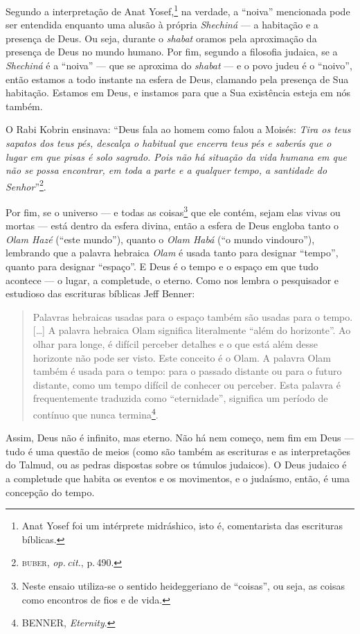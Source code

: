 Segundo a interpretação de Anat Yosef,\footnote{Anat Yosef foi um
  intérprete midráshico, isto é, comentarista das escrituras bíblicas.}
na verdade, a ``noiva'' mencionada pode ser entendida enquanto uma
alusão à própria \emph{Shechiná} --- a habitação e a presença de Deus.
Ou seja, durante o \emph{shabat} oramos pela aproximação da presença de
Deus no mundo humano. Por fim, segundo a filosofia judaica, se a
\emph{Shechiná} é a ``noiva'' --- que se aproxima do \emph{shabat} --- e
o povo judeu é o ``noivo'', então estamos a todo instante na esfera de
Deus, clamando pela presença de Sua habitação. Estamos em Deus, e
instamos para que a Sua existência esteja em nós também.

O Rabi Kobrin ensinava: ``Deus fala ao homem como falou a Moisés:
\emph{Tira os teus sapatos dos teus pés, descalça o habitual que encerra teus
pés e saberás que o lugar em que pisas é solo sagrado. Pois não há
situação da vida humana em que não se possa encontrar, em toda a parte e
a qualquer tempo, a santidade do Senhor}''\footnote{\textsc{buber}, \emph{op.\,cit.},
  p.\,490.}.

Por fim, se o universo --- e todas as coisas\footnote{Neste ensaio
  utiliza-se o sentido heideggeriano de ``coisas'', ou seja, as coisas
  como encontros de fios e de vida.} que ele contém, sejam elas vivas ou
mortas --- está dentro da esfera divina, então a esfera de Deus engloba
tanto o \emph{Olam Hazé} (``este mundo''), quanto o \emph{Olam Habá}
(``o mundo vindouro''), lembrando que a palavra hebraica \emph{Olam} é
usada tanto para designar ``tempo'', quanto para designar ``espaço''. E
Deus é o tempo e o espaço em que tudo acontece --- o lugar, a
completude, o eterno. Como nos lembra o pesquisador e estudioso das
escrituras bíblicas Jeff Benner:

\begin{quote}
Palavras hebraicas usadas para o espaço também são usadas para o tempo.
{[}\ldots{}{]} A palavra hebraica Olam significa literalmente ``além do
horizonte''. Ao olhar para longe, é difícil perceber detalhes e o que
está além desse horizonte não pode ser visto. Este conceito é o Olam. A
palavra Olam também é usada para o tempo: para o passado distante ou
para o futuro distante, como um tempo difícil de conhecer ou perceber.
Esta palavra é frequentemente traduzida como ``eternidade'', significa
um período de contínuo que nunca termina\footnote{BENNER,
  \emph{Eternity}.}.
\end{quote}

Assim, Deus não é infinito, mas eterno. Não há nem começo, nem fim em
Deus --- tudo é uma questão de meios (como são também as escrituras e as
interpretações do Talmud, ou as pedras dispostas sobre os
túmulos judaicos). O Deus judaico é a completude que habita os eventos e
os movimentos, e o judaísmo, então, é uma concepção do tempo.

